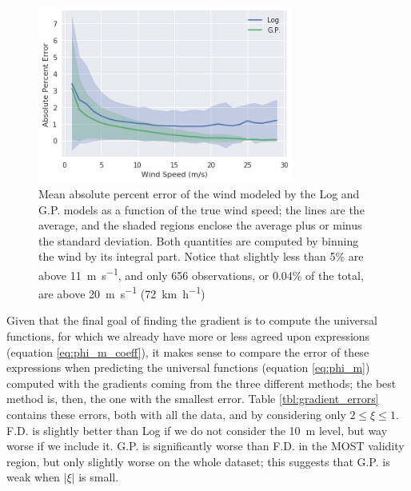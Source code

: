 \documentclass[a4paper]{book}
\begin{document}
\begin{figure}
    \centering
	\includegraphics[width=0.75\textwidth]{images/gp_log_perc_err_wind_speed}
	\caption{Mean absolute percent error of the wind modeled by the Log and G.P. models as a function of the true wind speed; the lines are the average, and the shaded regions enclose the average plus or minus the standard deviation. Both quantities are computed by binning the wind by its integral part. Notice that slightly less than 5\% are above \SI{11}{\meter\per\second}, and only 656 observations, or 0.04\% of the total, are above \SI{20}{\meter\per\second} (\SI{72}{\kilo\meter\per\hour})}
	\label{fig:gp_log_perc_err_wind_speed}
\end{figure}


Given that the final goal of finding the gradient is to compute the universal functions, for which we already have more or less agreed upon expressions (equation \ref{eq:phi_m_coeff}), it makes sense to compare the error of these expressions when predicting the universal functions (equation \ref{eq:phi_m}) computed with the gradients coming from the three different methods; the best method is, then, the one with the smallest error. Table \ref{tbl:gradient_errors} contains these errors, both with all the data, and by considering only $2\leq\xi\leq 1$. F.D. is slightly better than Log if we do not consider the \SI{10}{\meter} level, but way worse if we include it. G.P. is significantly worse than F.D. in the MOST validity region, but only slightly worse on the whole dataset; this suggests that G.P. is weak when $\vert\xi\vert$ is small. 
\end{document}
